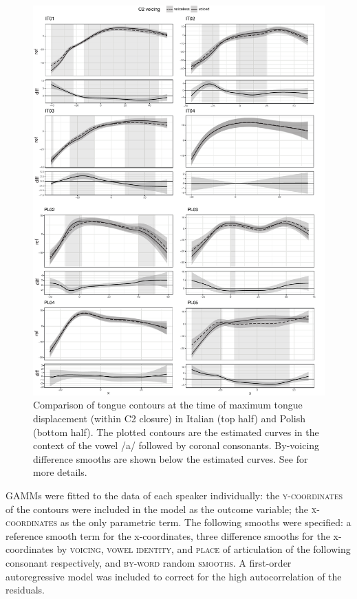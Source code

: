 \documentclass[authoryear, twocolumn]{elsarticle}
\begin{document}
\label{s:splines}

\begin{figure}
    \centering
    \includegraphics[height=.9\textheight]{fig/tra.pdf}
    \caption{Comparison of tongue contours at the time of maximum tongue displacement (within C2 closure) in Italian (top half) and Polish (bottom half). The plotted contours are the estimated curves in the context of the vowel /a/ followed by coronal consonants. By-voicing difference smooths are shown below the estimated curves. See  for more details.}
    \label{f:tra}
\end{figure}

GAMMs were fitted to the data of each speaker individually: the
\textsc{y-coordinates} of the contours were included in the model as the
outcome variable; the \textsc{x-coordinates} as the only parametric
term. The following smooths were specified: a reference smooth term for
the x-coordinates, three difference smooths for the x-coordinates by
\textsc{voicing}, \textsc{vowel identity}, and \textsc{place} of
articulation of the following consonant respectively, and
\textsc{by-word} random \textsc{smooths}. A first-order autoregressive
model was included to correct for the high autocorrelation of the
residuals.
\end{document}
